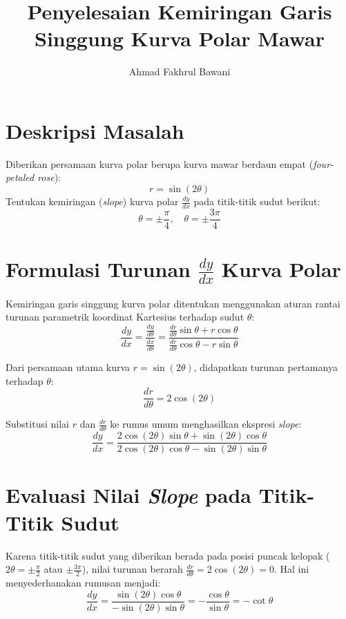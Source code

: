 \documentclass[11pt,a4paper]{article}
\title{\textbf{Penyelesaian Kemiringan Garis Singgung Kurva Polar Mawar}}
\author{Ahmad Fakhrul Bawani}
\date{}
\begin{document}
\maketitle

\section{Deskripsi Masalah}
Diberikan persamaan kurva polar berupa kurva mawar berdaun empat (\textit{four-petaled rose}):
\begin{equation}
  r = \sin(2\theta)
\end{equation}
Tentukan kemiringan (\textit{slope}) kurva polar $\frac{dy}{dx}$ pada titik-titik sudut berikut:
\begin{equation*}
  \theta = \pm\frac{\pi}{4}, \quad \theta = \pm\frac{3\pi}{4}
\end{equation*}

\section{Formulasi Turunan $\frac{dy}{dx}$ Kurva Polar}
Kemiringan garis singgung kurva polar ditentukan menggunakan aturan rantai turunan parametrik koordinat Kartesius terhadap sudut $\theta$:
\begin{equation}
  \frac{dy}{dx} = \frac{\frac{dy}{d\theta}}{\frac{dx}{d\theta}} = \frac{\frac{dr}{d\theta}\sin\theta + r\cos\theta}{\frac{dr}{d\theta}\cos\theta - r\sin\theta}
\end{equation}

Dari persamaan utama kurva $r = \sin(2\theta)$, didapatkan turunan pertamanya terhadap $\theta$:
\begin{equation}
  \frac{dr}{d\theta} = 2\cos(2\theta)
\end{equation}

Substitusi nilai $r$ dan $\frac{dr}{d\theta}$ ke rumus umum menghasilkan ekspresi \textit{slope}:
\begin{equation}
  \frac{dy}{dx} = \frac{2\cos(2\theta)\sin\theta + \sin(2\theta)\cos\theta}{2\cos(2\theta)\cos\theta - \sin(2\theta)\sin\theta}
\end{equation}

\section{Evaluasi Nilai \textit{Slope} pada Titik-Titik Sudut}
Karena titik-titik sudut yang diberikan berada pada posisi puncak kelopak ($2\theta = \pm\frac{\pi}{2}$ atau $\pm\frac{3\pi}{2}$), nilai turunan berarah $\frac{dr}{d\theta} = 2\cos(2\theta) = 0$. Hal ini menyederhanakan rumusan menjadi:
\begin{equation}
  \frac{dy}{dx} = \frac{\sin(2\theta)\cos\theta}{-\sin(2\theta)\sin\theta} = -\frac{\cos\theta}{\sin\theta} = -\cot\theta
\end{equation}
\end{document}
